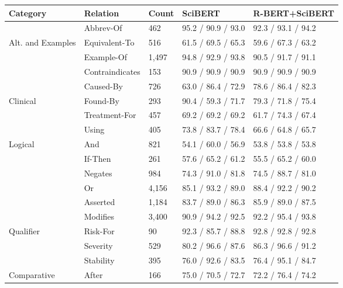 \begin{tabular}{m{3cm} m{3cm} m{2cm} m{3cm} m{3.7cm}}
\toprule
    \textbf{Category} & \textbf{Relation} & \textbf{Count} & \textbf{SciBERT} & \textbf{R-BERT+SciBERT} \\ \midrule
     & Abbrev-Of &           462 & 95.2 / 90.9 / 93.0 & 92.3 / 93.1 / 94.2 \\
    Alt. and Examples & Equivalent-To & 516 & 61.5 / 69.5 / 65.3 & 59.6 / 67.3 / 63.2 \\
     &                       Example-Of & 1,497 & 94.8 / 92.9 / 93.8 & 90.5 / 91.7 / 91.1 \\
    \hline
     &                       Contraindicates & 153 & 90.9 / 90.9 / 90.9 & 90.9 / 90.9 / 90.9 \\
     &                       Caused-By & 726 & 63.0 / 86.4 / 72.9 & 78.6 / 86.4 / 82.3 \\
     Clinical &              Found-By & 293 & 90.4 / 59.3 / 71.7 & 79.3 / 71.8 / 75.4 \\
     &                       Treatment-For & 457 & 69.2 / 69.2 / 69.2 & 61.7 / 74.3 / 67.4 \\
     &                       Using & 405 & 73.8 / 83.7 / 78.4 & 66.6 / 64.8 / 65.7 \\
    \hline
    \multirow{4}{*}[0pt]{\mbox{Logical}} & And & 821 & 54.1 / 60.0 / 56.9 & 53.8 / 53.8 / 53.8 \\
     &                       If-Then & 261 & 57.6 / 65.2 / 61.2 & 55.5 / 65.2 / 60.0 \\
     &                       Negates & 984 & 74.3 / 91.0 / 81.8 & 74.5 / 88.7 / 81.0 \\
     &                       Or & 4,156 & 85.1 / 93.2 / 89.0 & 88.4 / 92.2 / 90.2 \\
    \hline
     &               Asserted & 1,184 & 83.7 / 89.0 / 86.3 & 85.9 / 89.0 / 87.5 \\
     &                       Modifies & 3,400 & 90.9 / 94.2 / 92.5 & 92.2 / 95.4 / 93.8 \\
    Qualifier &               Risk-For & 90 & 92.3 / 85.7 / 88.8 & 92.8 / 92.8 / 92.8 \\
     &                       Severity & 529 & 80.2 / 96.6 / 87.6 & 86.3 / 96.6 / 91.2 \\
     &                       Stability & 395 & 76.0 / 92.6 / 83.5 & 76.4 / 95.1 / 84.7 \\
    \hline
    \multirow{6}{*}[-5pt]{Comparative} & After & 166 & 75.0 / 70.5 / 72.7 & 72.2 / 76.4 / 74.2 \\

\end{tabular}
